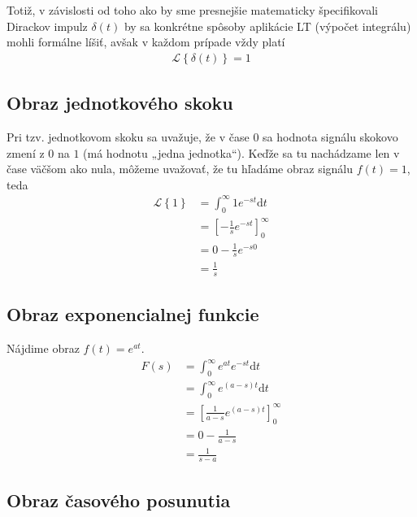 \documentclass[a4paper, 10pt, ]{article}
\begin{document}
Totiž, v závislosti od toho ako by sme presnejšie matematicky špecifikovali Dirackov impulz $\delta(t)$ by sa konkrétne spôsoby aplikácie LT (výpočet integrálu) mohli formálne líšiť, avšak v každom prípade vždy platí
\begin{align}
    \mathcal L \left\{ \delta(t) \right\} = 1
\end{align}





\subsection{Obraz jednotkového skoku}
Pri tzv. jednotkovom skoku sa uvažuje, že v čase $0$ sa hodnota signálu skokovo zmení z $0$ na $1$ (má hodnotu „jedna jednotka“). Keďže sa tu nachádzame len v čase väčšom ako nula, môžeme uvažovať, že tu hľadáme obraz signálu $f(t) = 1$, teda
\begin{equation}
    \begin{aligned}
        \mathcal L \left\{ 1 \right\} &= \int_0^\infty 1 e^{-st}\text{d}t \\
        &= \left[ - \frac{1}{s} e^{-st} \right]_0^\infty \\
        &= 0 - \frac{1}{s} e^{-s0} \\
        &= \frac{1}{s}
    \end{aligned}
\end{equation}



\subsection{Obraz exponencialnej funkcie}
\label{vyhlcast}

Nájdime obraz $f(t) = e^{at}$.
\begin{equation}
    \begin{aligned}
        F(s) &= \int_0^\infty e^{at} e^{-st}\text{d}t \\
        &= \int_0^\infty e^{(a-s)t}\text{d}t \\
        &= \left[ \frac{1}{a-s} e^{(a-s)t} \right]_0^\infty \\
        &= 0 - \frac{1}{a-s} \\
        &= \frac{1}{s - a}
    \end{aligned}
\end{equation}




\subsection{Obraz časového posunutia}
\end{document}
